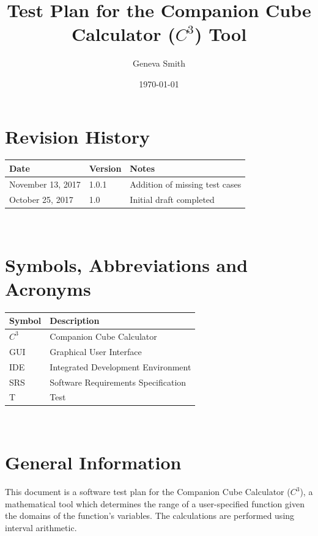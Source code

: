 \documentclass[12pt, titlepage]{article}
\newcommand{\progname}{Companion Cube Calculator} %
\newcommand{\prognameAbbrv}{$C^{3}$}
\begin{document}
\title{Test Plan for the \progname{} (\prognameAbbrv{}) Tool} 
\author{Geneva Smith}
\date{\today}
	
\maketitle


\section{Revision History}

\begin{tabularx}{\textwidth}{p{3.5cm}p{2cm}X}
\toprule {\bf Date} & {\bf Version} & {\bf Notes}\\
\midrule
November 13, 2017 & 1.0.1 & Addition of missing test cases\\
October 25, 2017 & 1.0 & Initial draft completed\\
\bottomrule
\end{tabularx}

~\newpage

\section{Symbols, Abbreviations and Acronyms}

\renewcommand{\arraystretch}{1.2}
\begin{tabular}{l l} 
  \toprule		
  \textbf{Symbol} & \textbf{Description}\\
  \midrule 
  \prognameAbbrv{} & \progname{}\\
  GUI & Graphical User Interface\\
  IDE & Integrated Development Environment\\
  SRS & Software Requirements Specification\\
  T & Test\\
  \bottomrule
\end{tabular}\\

\newpage

\tableofcontents

\listoftables

\listoffigures

\newpage


\section{General Information}
This document is a software test plan for the \progname{} (\prognameAbbrv{}), a 
mathematical tool which determines the range of a user-specified function given 
the domains of the function's variables. The calculations are performed using 
interval arithmetic.
\end{document}
